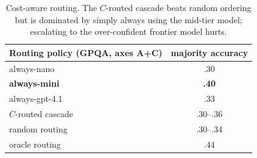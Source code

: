 \documentclass[11pt]{article}
\newcommand{\C}{\textit{C}}
\begin{document}
\begin{table}[t]
\centering\footnotesize
\begin{tabular}{@{}lc@{}}
\toprule
Routing policy (GPQA, axes A+C) & majority accuracy \\
\midrule
always-nano & .30 \\
\textbf{always-mini} & \textbf{.40} \\
always-gpt-4.1 & .33 \\
$\C$-routed cascade & .30--.36 \\
random routing & .30--.34 \\
oracle routing & .44 \\
\bottomrule
\end{tabular}
\caption{Cost-aware routing. The $\C$-routed cascade beats random ordering but is dominated by simply
always using the mid-tier model; escalating to the over-confident frontier model hurts.}
\label{tab:cascade}
\end{table}
\end{document}
